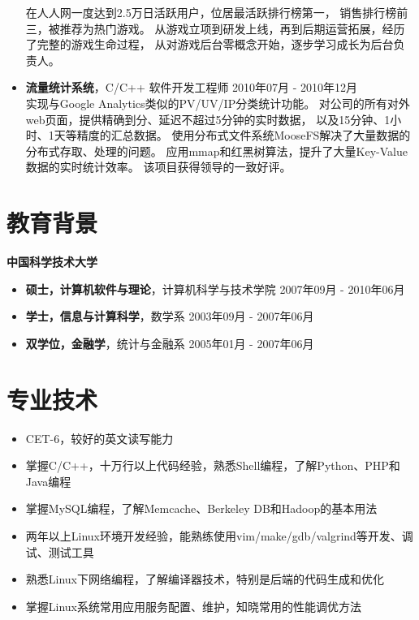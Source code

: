 \documentclass[margin]{res}
\newcommand{\ustc}{中国科学技术大学}
\begin{document}
\begin{itemize}
        在人人网一度达到2.5万日活跃用户，位居最活跃排行榜第一，
        销售排行榜前三，被推荐为热门游戏。
        从游戏立项到研发上线，再到后期运营拓展，经历了完整的游戏生命过程，
        从对游戏后台零概念开始，逐步学习成长为后台负责人。
        \\
   \item {\bf 流量统计系统}，C/C++ 软件开发工程师 
       \hfill 2010年07月 - 2010年12月\\[1mm]
       实现与Google Analytics类似的PV/UV/IP分类统计功能。
       对公司的所有对外web页面，提供精确到分、延迟不超过5分钟的实时数据，
       以及15分钟、1小时、1天等精度的汇总数据。
       使用分布式文件系统MooseFS解决了大量数据的分布式存取、处理的问题。
       应用mmap和红黑树算法，提升了大量Key-Value数据的实时统计效率。
       该项目获得领导的一致好评。



\end{itemize}

\section{\Large 教育背景}
{\bf \large \ustc}\\[1mm]
\begin{itemize}
    \item {\bf 硕士，计算机软件与理论}，计算机科学与技术学院 \hfill 2007年09月 - 2010年06月
    \item {\bf 学士，信息与计算科学}，数学系 \hfill 2003年09月 - 2007年06月
    \item {\bf 双学位，金融学}，统计与金融系 \hfill 2005年01月 - 2007年06月
\end{itemize}


\section{\Large 专业技术}
\begin{itemize}
    \item CET-6，较好的英文读写能力
    \item 掌握C/C++，十万行以上代码经验，熟悉Shell编程，了解Python、PHP和Java编程
    \item 掌握MySQL编程，了解Memcache、Berkeley DB和Hadoop的基本用法
    \item 两年以上Linux环境开发经验，能熟练使用vim/make/gdb/valgrind等开发、调试、测试工具
    \item 熟悉Linux下网络编程，了解编译器技术，特别是后端的代码生成和优化
    \item 掌握Linux系统常用应用服务配置、维护，知晓常用的性能调优方法
\end{itemize}
\end{document}
